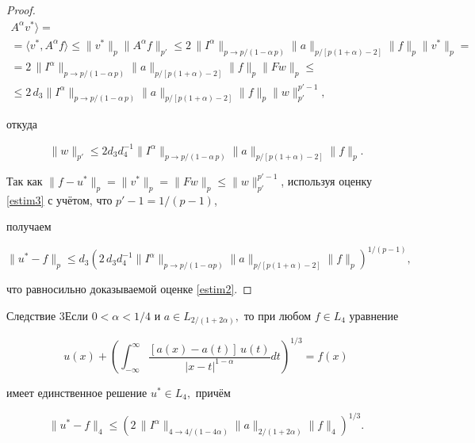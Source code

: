 \begin{proof}
\begin{multline*}
A^{\alpha}v^*\rangle=\\

=\langle v^*, A^\alpha f\rangle\leq \|v^*\|_p\|A^\alpha

f\|_{p'}\leq 2\,\|I^\alpha\|_{p\to

p/(1-\alpha\,p)}\|a\|_{p/[p(1+\alpha)-2]}\|f\|_p \|v^*\|_p=\\

=2\,\|I^\alpha\|_{p\to

p/(1-\alpha\,p)}\|a\|_{p/[p(1+\alpha)-2]}\|f\|_p \|Fw\|_p\leq\\

\leq 2\,d_3\|I^\alpha\|_{p\to

p/(1-\alpha\,p)}\|a\|_{p/[p(1+\alpha)-2]}\|f\|_p

\|w\|_{p'}^{p'-1},

\end{multline*}

 откуда

\begin{equation}

\label{estim3}

\|w\|_{p'}\leq 2d_3d_4^{-1}\|I^\alpha\|_{p\to p/(1-\alpha\,p)}\|a\|_{p/[p(1+\alpha)-2]}\|f\|_p.

\end{equation}

Так как $\|f-u^*\|_p=\|v^*\|_p=\|Fw\|_p\leq \|w\|_{p'}^{p'-1}$, используя оценку \eqref{estim3} с учётом, что $p'-1=1/(p-1)$,

получаем

$$

\|u^*-f\|_p\leq d_3\left(2\,d_3d_4^{-1}\|I^\alpha\|_{p\to

p/(1-\alpha

p)}\|a\|_{p/[p(1+\alpha)-2]}\|f\|_p\right)^{1/(p-1)},

$$

что равносильно доказываемой оценке \eqref{estim2}.

\end{proof}



\smallskip



\begin{newthm}{Следствие 3}Если $0<\alpha<1/4$ и $a\in L_{2/(1+2\alpha)},$ то при любом $f\in

L_4$ уравнение

$$

u(x)+\left(\int _{-\infty}^{\infty}\frac{[a(x)-a(t)]\,u(t)}{|x-t|^{1-\alpha}}dt\right)^{1/3}=f(x)

$$

имеет единственное решение $u^*\in L_4,$ причём

$$

\|u^*-f\|_4\leq \left(2\,\|I^\alpha\|_{4\to

4/(1-4\alpha)}\|a\|_{2/(1+2\alpha)}\|f\|_4\right)^{1/3}.

$$

\end{newthm}



